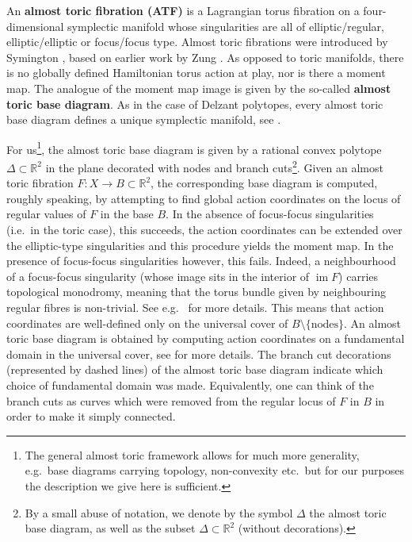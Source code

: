 \documentclass[12pt,a4paper,abstract=true,draft]{scrartcl}
\DeclareMathOperator{\im}{im}
\begin{document}
An \textbf{almost toric fibration (ATF)} is a Lagrangian torus fibration on a four-dimensional symplectic manifold whose singularities are all of elliptic\-/regular, elliptic\-/elliptic or focus\-/focus type.
Almost toric fibrations were introduced by Sy\-ming\-ton \cite{symington2002FourDF}, based on earlier work by Zung \cite{Zun96,Zun97,Zun03}.
As opposed to toric manifolds, there is no globally defined Hamiltonian torus action at play, nor is there a moment map.
The analogue of the moment map image is given by the so-called \textbf{almost toric base diagram}.
As in the case of Delzant polytopes, every almost toric base diagram defines a unique symplectic manifold, see \cite[Corollary 5.4]{symington2002FourDF} \cite[Theorem 8.5]{evans2021atfs}. 

For us\footnote{The general almost toric framework allows for much more generality, e.g.\ base diagrams carrying topology, non-convexity etc.\ but for our purposes the description we give here is sufficient.}, the almost toric base diagram is given by a rational convex polytope $\Delta \subset \mathbb{R}^2$ in the plane decorated with nodes and branch cuts\footnote{By a small abuse of notation, we denote by the symbol $\Delta$ the almost toric base diagram, as well as the subset $\Delta \subset \mathbb{R}^2$ (without decorations).}.
Given an almost toric fibration $F \colon X \rightarrow B \subset \mathbb{R}^2$, the corresponding base diagram is computed, roughly speaking, by attempting to find global action coordinates on the locus of regular values of $F$ in the base $B$.
In the absence of focus-focus singularities (i.e.\ in the toric case), this succeeds, the action coordinates can be extended over the elliptic-type singularities and this procedure yields the moment map.
In the presence of focus-focus singularities however, this fails.
Indeed, a neighbourhood of a focus-focus singularity (whose image sits in the interior of $\im F$) carries topological monodromy, meaning that the torus bundle given by neighbouring regular fibres is non-trivial.
See e.g.\ \cite{Zun97} for more details.
This means that action coordinates are well-defined only on the universal cover of $B \setminus \{\text{nodes}\}$.
An almost toric base diagram is obtained by computing action coordinates on a fundamental domain in the universal cover, see \cite[Definition 8.3]{evans2021atfs} for more details.
The branch cut decorations (represented by dashed lines) of the almost toric base diagram indicate which choice of fundamental domain was made.
Equivalently, one can think of the branch cuts as curves which were removed from the regular locus of $F$ in $B$ in order to make it simply connected.
\end{document}
